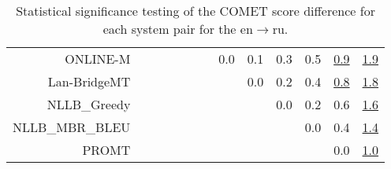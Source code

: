 \documentclass[11pt]{article}
\begin{document}
\begin{sidewaystable}
\begin{center}
{\begin{tabular}{rcccccccccccc}
ONLINE-M &  &  &  &  &  &  & \cellcolor{red!0} 0.0 & \cellcolor{red!0} 0.1 & \cellcolor{red!0} 0.3 & \cellcolor{red!50} 0.5 & \cellcolor{red!70} \underline{0.9} & \cellcolor{red!70} \underline{1.9}\\ 
Lan-BridgeMT &  &  &  &  &  &  &  & \cellcolor{red!0} 0.0 & \cellcolor{red!0} 0.2 & \cellcolor{red!30} 0.4 & \cellcolor{red!70} \underline{0.8} & \cellcolor{red!70} \underline{1.8}\\ 
NLLB\_Greedy &  &  &  &  &  &  &  &  & \cellcolor{red!0} 0.0 & \cellcolor{red!0} 0.2 & \cellcolor{red!70} 0.6 & \cellcolor{red!70} \underline{1.6}\\ 
NLLB\_MBR\_BLEU &  &  &  &  &  &  &  &  &  & \cellcolor{red!0} 0.0 & \cellcolor{red!50} 0.4 & \cellcolor{red!70} \underline{1.4}\\ 
PROMT &  &  &  &  &  &  &  &  &  &  & \cellcolor{red!0} 0.0 & \cellcolor{red!70} \underline{1.0}\\ 
\bottomrule 
\end{tabular} }
\caption{Statistical significance testing of the COMET score difference for each system pair for the en$\rightarrow$ru.} 
 \end{center} \end{sidewaystable} 
\end{document}

